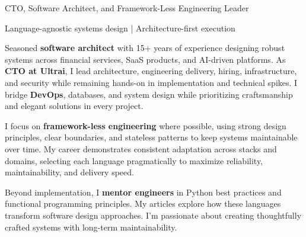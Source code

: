 \documentclass[a4paper,10pt]{article}
\title{\doctitle}
\begin{document}
\noindent
{\Large{}\selectfont\color{darkblue} CTO, Software Architect, and Framework-Less Engineering Leader}

\vspace{0.2cm}
{\selectfont\color{darkblue} Language-agnostic systems design | Architecture-first execution}
\vspace{0.3cm}

\noindent
\begin{minipage}[t]{0.7\textwidth}
	\vspace{0pt}
	\justifying

	Seasoned \textbf{software architect} with 15+ years of experience designing robust systems
	across financial services, SaaS products, and AI-driven platforms. As \textbf{CTO at Ultrai}, I
	lead architecture, engineering delivery, hiring, infrastructure, and security while remaining
	hands-on in implementation and technical spikes. I bridge \textbf{DevOps}, databases, and
	system design while prioritizing craftsmanship and elegant solutions in every project.
	\vspace{0.55cm}

	I focus on \textbf{framework-less engineering} where possible, using strong design principles,
	clear boundaries, and stateless patterns to keep systems maintainable over time.
	My career demonstrates consistent adaptation across stacks and domains, selecting each
	language pragmatically to maximize reliability, maintainability, and delivery speed.
	\vspace{0.55cm}

	Beyond implementation, I \textbf{mentor engineers} in Python best practices and functional
	programming principles. My articles explore how these
	languages transform software design approaches. I'm passionate about creating
	thoughtfully crafted systems with long-term maintainability.

\end{minipage}%
\hfill%
\end{document}

